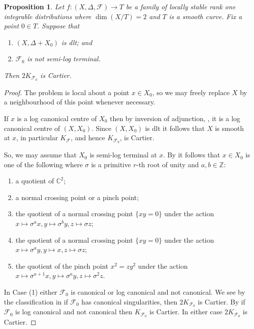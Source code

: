 \documentclass[12pt, a4paper]{amsart}
\newcounter{Theorem}
\newtheorem{proposition}[theorem]{Proposition}
\theoremstyle{definition}
\theoremstyle{named}
\begin{document}
\begin{proposition}
\label{prop_index_dlt_case}
        Let $f\colon (X, \Delta, \mathcal F) \rightarrow T$
    be a family of locally stable rank one integrable distributions where $\dim (X/T) = 2$ and $T$ is a smooth curve. Fix a point $0 \in T$.  Suppose that 
    \begin{enumerate}
        \item $(X, \Delta+X_0)$ is dlt; and 
  
                \item $\mathcal F_0$ is not semi-log terminal.
    \end{enumerate}
     Then $2K_{\mathcal F_0}$ is Cartier. 
\end{proposition}
\begin{proof}
The problem is local about a point $x \in X_0$, 
so we may freely replace $X$ by a neighbourhood of this point 
whenever necessary.



If $x$ is a log canonical centre of $X_0$ then by inversion of adjunction, \cite{Kawakita05}, it is a log canonical centre of $(X, X_0)$.
Since $(X, X_0)$ is dlt it follows that $X$ is smooth at $x$, 
in particular $K_{\mathcal F}$, and hence $K_{\mathcal F_0}$,
 is Cartier.

So, we may assume that $X_0$ is semi-log terminal at 
$x$.  By \cite[Theorem 4.23]{KSB88}
it follows that $x \in X_0$ is one of the following
where $\sigma$ is a primitive $r$-th root of unity and 
$a, b \in \mathbb Z$:
\begin{enumerate}
    \item a quotient of $\mathbb C^2$;
    \item a normal crossing point or a pinch point;
    \item the quotient of a normal crossing point $\{xy = 0\}$
    under the action $x \mapsto \sigma^a x, y\mapsto \sigma^b y, z \mapsto \sigma z$;
    \item the quotient of a normal crossing point $\{xy = 0\}$
    under the action $x \mapsto \sigma^a y, y \mapsto x, z \mapsto \sigma z$;
    \item the quotient of the pinch point $x^2 = zy^2$ under the action $x\mapsto \sigma^{a+1}x, y\mapsto \sigma^a y, z\mapsto \sigma^2 z$.
\end{enumerate}



In Case (1) either $\mathcal F_0$ is canonical or log canonical and not canonical.  We see by the classification in \cite[Fact I.2.4]{McQuillan08} 
if $\mathcal F_0$ has canonical singularities, then $2K_{\mathcal F_0}$
is Cartier.  By \cite[Lemma 2.11]{SS23} if $\mathcal F_0$ is log canonical 
and not canonical then $K_{\mathcal F_0}$ is Cartier. 
In either case $2K_{\mathcal F_0}$ is Cartier.


\end{proof}
\end{document}
